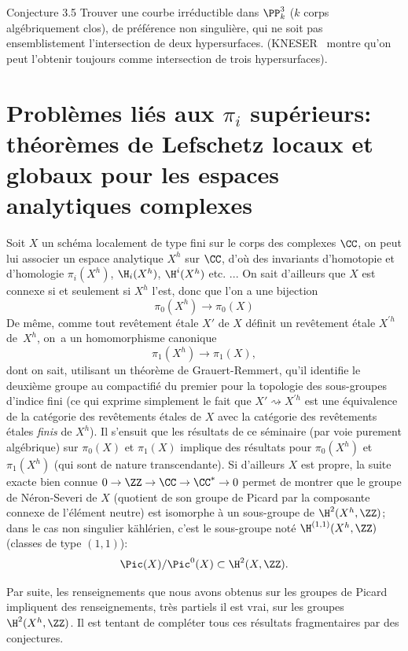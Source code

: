 \label{XIII.3.5}
\begin{enonce*}{Conjecture 3.5\ndemark} Trouver une courbe irr\'eductible dans $\PP^3_k$ ($k$ corps alg\'ebriquement clos), de pr\'ef\'erence non singuli\`ere, qui ne soit pas ensemblistement l'intersection de deux hypersurfaces. (KNESER~\cite{XIII.4} montre qu'on peut l'obtenir toujours comme intersection de trois hypersurfaces).
\end{enonce*}
\ignorespaces

\section[Probl\`emes li\'es aux $\pi_i$ sup\'erieurs]{Probl\`emes li\'es aux $\pi_i$ sup\'erieurs: th\'eor\`emes de Lefschetz locaux et globaux pour les espaces analytiques complexes\ndemark} \label{XIII.4}

Soit $X$ un sch\'ema localement de type fini sur le corps des complexes $\CC$, on peut lui associer un espace analytique $X^h$ sur $\CC$, d'o\`u des invariants d'homotopie et d'homologie $\pi_i(X^h)$, $\H_i(X^h)$, $\H^i(X^h)$ etc. ... On sait d'ailleurs que $X$ est connexe si et seulement si $X^h$ l'est, donc que l'on a une bijection
$$
\pi_0(X^h)\to \pi_0(X)$$
De m\^eme, comme tout rev\^etement \'etale $X'$ de $X$ d\'efinit un rev\^etement \'etale $X^{\prime h}$ de~$X^h$, on~a un homomorphisme canonique
$$
\pi_1(X^h)\to \pi_1(X),
$$
dont on sait, utilisant un th\'eor\`eme de Grauert-Remmert, qu'il identifie le deuxi\`eme groupe au compactifi\'e du premier pour la topologie des sous-groupes d'indice fini (ce qui exprime simplement le fait que $X'\rightsquigarrow X^{\prime h}$ est une \'equivalence de la cat\'egorie des rev\^etements \'etales de $X$ avec la cat\'egorie des rev\^etements \'etales \emph{finis} de $X^h$). Il s'ensuit que les r\'esultats de ce s\'eminaire (par voie purement alg\'ebrique) sur $\pi_0(X)$ et $\pi_1(X)$ implique des r\'esultats pour $\pi_0(X^h)$ et $\pi_1(X^h)$ (qui sont de nature transcendante). Si d'ailleurs $X$ est propre, la suite exacte bien connue $0\to \ZZ \to \CC\to \CC^*\to 0$ permet de montrer que le groupe de N\'eron-Severi de $X$ (quotient de son groupe de Picard par la composante connexe de l'\'el\'ement neutre) est isomorphe \`a un sous-groupe de $\H^2(X^h, \ZZ)$; dans le cas non singulier k\"ahl\'erien, c'est le sous-groupe not\'e $\H^{(1, 1)}(X^h, \ZZ)$ (classes de type $(1, 1)$):
$$
\Pic(X)/\Pic^0(X)\subset \H^2(X, \ZZ).
$$

Par suite, les renseignements que nous avons obtenus sur les groupes de Picard impliquent des renseignements, tr\`es partiels il est vrai, sur les groupes $\H^2(X^h, \ZZ)$. Il est tentant de compl\'eter tous ces r\'esultats fragmentaires par des conjectures.

